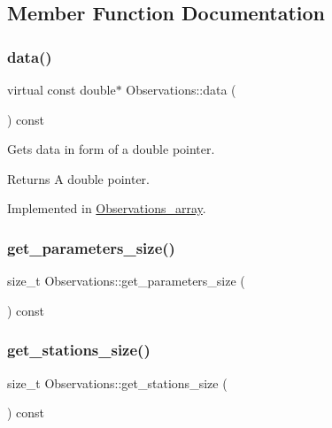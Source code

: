\subsection{Member Function Documentation}
\mbox{\label{class_observations_abd666d72594c8e61234296626756ec01}} 
\subsubsection{\texorpdfstring{data()}{data()}}
{\footnotesize\ttfamily virtual const double$\ast$ Observations\+::data (\begin{DoxyParamCaption}{ }\end{DoxyParamCaption}) const\hspace{0.3cm}{\ttfamily [pure virtual]}}

Gets data in form of a double pointer. \begin{DoxyReturn}{Returns}
A double pointer. 
\end{DoxyReturn}


Implemented in \mbox{\hyperlink{class_observations__array_a75c4a3fea9a8ccd370309058701204f4}{Observations\+\_\+array}}.

\mbox{\label{class_observations_a4ae6818f6d01490eb14d63ce51a1d331}} 
\subsubsection{\texorpdfstring{get\+\_\+parameters\+\_\+size()}{get\_parameters\_size()}}
{\footnotesize\ttfamily size\+\_\+t Observations\+::get\+\_\+parameters\+\_\+size (\begin{DoxyParamCaption}{ }\end{DoxyParamCaption}) const}

\mbox{\label{class_observations_a30f67730e600545cf8cb9d7aed13bd33}} 
\subsubsection{\texorpdfstring{get\+\_\+stations\+\_\+size()}{get\_stations\_size()}}
{\footnotesize\ttfamily size\+\_\+t Observations\+::get\+\_\+stations\+\_\+size (\begin{DoxyParamCaption}{ }\end{DoxyParamCaption}) const}

